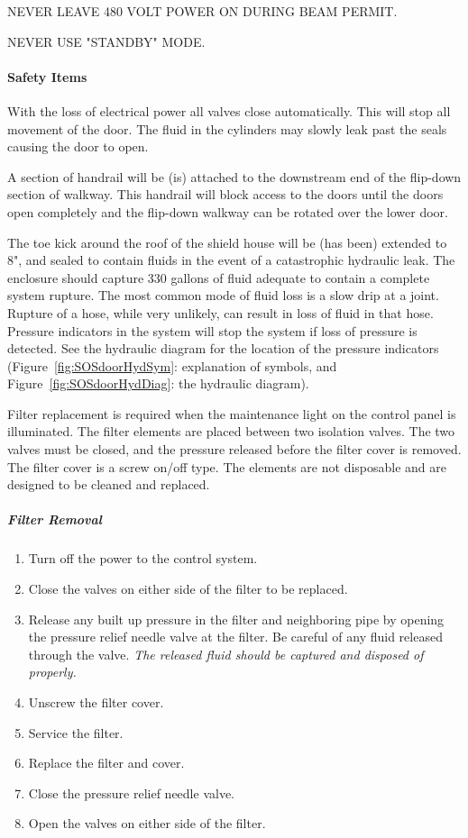 NEVER LEAVE 480 VOLT POWER ON DURING BEAM PERMIT.

NEVER USE "STANDBY" MODE.



\paragraph{Safety Items}

With the loss of electrical power all valves close automatically. This will
stop all movement of the door. The fluid in the cylinders may slowly leak
past the seals causing the door to open.

A section of handrail will be (is) attached to the downstream end of the
flip-down section of walkway. This handrail will block access to the doors
until the doors open completely and the flip-down walkway can be rotated
over the lower door.

The toe kick around the roof of the shield house will be (has been)
extended to 8", and sealed to contain fluids in the event of a catastrophic
hydraulic leak. The enclosure should capture 330 gallons of fluid adequate
to contain a complete system rupture.  The most common mode of fluid
loss is a slow drip at a joint. Rupture of a hose, while very unlikely, can
result in loss of fluid in that hose. Pressure indicators in the system
will stop
the system if loss of pressure is detected. See the hydraulic diagram for
the location of the pressure indicators (Figure~\ref{fig:SOSdoorHydSym}: explanation of symbols,
and Figure~\ref{fig:SOSdoorHydDiag}: the hydraulic diagram).

Filter replacement is required when the maintenance light on the control
panel is illuminated. The filter elements are placed between two isolation
valves. The two valves must be closed, and the pressure released before
the filter cover is removed. The filter cover is a screw on/off type. The
elements are not disposable and are designed to be cleaned and replaced.

\subparagraph{Filter Removal}

\begin{enumerate}
\item{Turn off the power to the control system.}
\item{Close the valves on either side of the filter to be replaced.}
\item{Release any built up pressure in the filter and neighboring pipe by
opening the pressure relief needle valve at the filter. Be careful of any fluid
released through the valve. {\sl The released fluid should be captured and
disposed of properly.}}
\item{Unscrew the filter cover.}
\item{Service the filter.}
\item{Replace the filter and cover.}
\item{Close the pressure relief needle valve.}
\item{Open the valves on either side of the filter.}
\end{enumerate}

